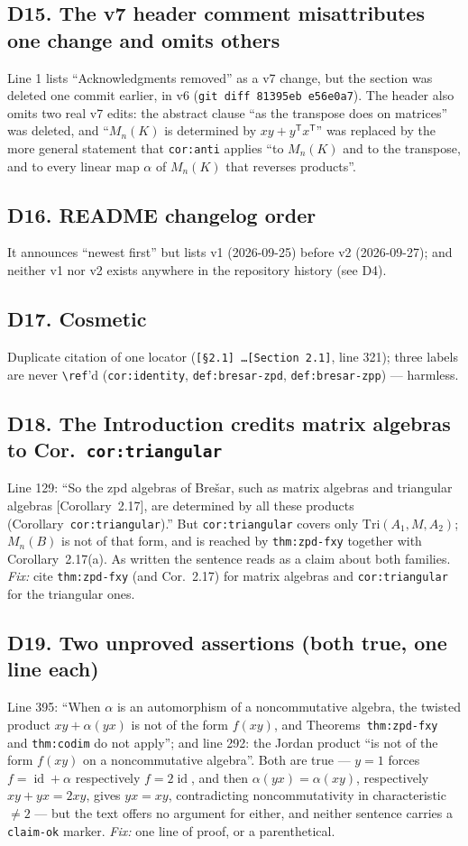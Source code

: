 \documentclass[11pt,a4paper]{article}
\newcommand{\cpt}[1]{\texttt{#1}}          %
\begin{document}
\subsection*{D15. The v7 header comment misattributes one change and omits others}
Line 1 lists ``Acknowledgments removed'' as a v7 change, but the section was deleted one commit earlier,
in v6 (\cpt{git diff 81395eb e56e0a7}). The header also omits two real v7 edits: the abstract clause ``as
the transpose does on matrices'' was deleted, and ``$M_n(K)$ is determined by $xy+y^{\mathsf T}x^{\mathsf
T}$'' was replaced by the more general statement that \cpt{cor:anti} applies ``to $M_n(K)$ and to the
transpose, and to every linear map $\alpha$ of $M_n(K)$ that reverses products''.

\subsection*{D16. README changelog order}
It announces ``newest first'' but lists v1 (2026-09-25) before v2 (2026-09-27); and neither v1 nor v2
exists anywhere in the repository history (see D4).

\subsection*{D17. Cosmetic}
Duplicate citation of one locator (\cpt{[\S2.1] \ldots [Section 2.1]}, line 321); three labels are never
\cpt{\textbackslash ref}'d (\cpt{cor:identity}, \cpt{def:bresar-zpd}, \cpt{def:bresar-zpp}) --- harmless.

\subsection*{D18. The Introduction credits matrix algebras to Cor.~\cpt{cor:triangular}}
Line 129: ``So the zpd algebras of Bre\v{s}ar, such as matrix algebras and triangular algebras
[Corollary~2.17], are determined by all these products (Corollary~\cpt{cor:triangular}).'' But
\cpt{cor:triangular} covers only $\mathrm{Tri}(A_1,M,A_2)$; $M_n(B)$ is not of that form, and is reached
by \cpt{thm:zpd-fxy} together with Corollary~2.17(a). As written the sentence reads as a claim about both
families. \emph{Fix:} cite \cpt{thm:zpd-fxy} (and Cor.~2.17) for matrix algebras and \cpt{cor:triangular}
for the triangular ones.

\subsection*{D19. Two unproved assertions (both true, one line each)}
Line 395: ``When $\alpha$ is an automorphism of a noncommutative algebra, the twisted product
$xy+\alpha(yx)$ is not of the form $f(xy)$, and Theorems~\cpt{thm:zpd-fxy} and \cpt{thm:codim} do not
apply''; and line 292: the Jordan product ``is not of the form $f(xy)$ on a noncommutative algebra''.
Both are true --- $y=1$ forces $f=\operatorname{id}+\alpha$ respectively $f=2\operatorname{id}$, and then
$\alpha(yx)=\alpha(xy)$, respectively $xy+yx=2xy$, gives $yx=xy$, contradicting noncommutativity in
characteristic $\ne2$ --- but the text offers no argument for either, and neither sentence carries a
\cpt{claim-ok} marker. \emph{Fix:} one line of proof, or a parenthetical.
\end{document}
